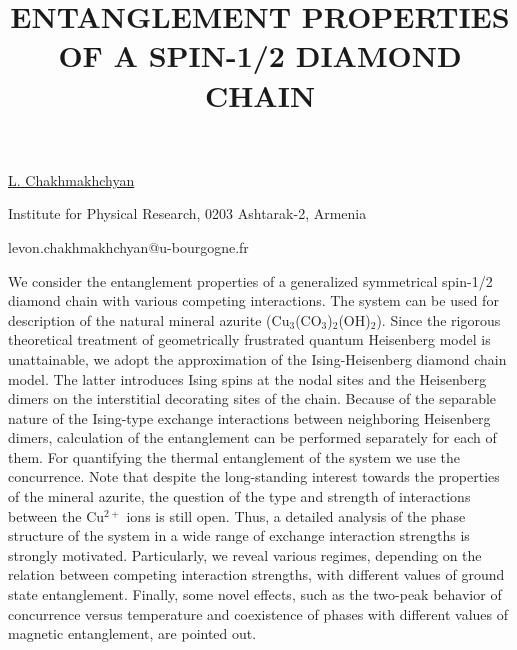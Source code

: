 \title{ENTANGLEMENT PROPERTIES OF A SPIN-1/2 DIAMOND CHAIN}

\underline{L. Chakhmakhchyan} 

{\normalsize{
\vspace{-4mm}
\dijon

\vspace{-4mm}
Institute for Physical Research, 0203 Ashtarak-2, Armenia

\email levon.chakhmakhchyan@u-bourgogne.fr}}

We consider the entanglement properties of a generalized symmetrical spin-1/2 diamond chain with various competing interactions. The system can be used for description of the natural mineral azurite (Cu$_3$(CO$_3$)$_2$(OH)$_2$). Since the rigorous theoretical treatment of geometrically frustrated quantum Heisenberg model is unattainable, we adopt the approximation of the Ising-Heisenberg diamond chain model. The latter introduces Ising spins at the nodal sites and the Heisenberg dimers on the interstitial decorating sites of the chain.  Because of the separable nature of the Ising-type exchange interactions between neighboring Heisenberg dimers, calculation of the entanglement can be performed separately for each of them. For quantifying the thermal entanglement of the system we use the concurrence. Note that despite the long-standing interest towards the properties of the mineral azurite, the question of the type and strength of interactions between the Cu$^{2+}$
ions is still open. Thus, a detailed analysis of the phase structure of the system in a wide range of exchange interaction strengths is strongly motivated. Particularly, we reveal various regimes, depending on the relation between competing interaction strengths, with different values of ground state entanglement. Finally, some novel effects, such as the two-peak behavior of concurrence versus temperature and coexistence of phases with different values of magnetic entanglement, are pointed out.

\vspace{\baselineskip}

